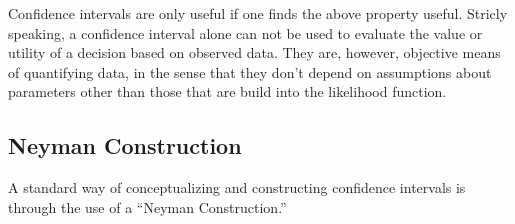 Confidence intervals are only useful if one finds the above property useful.
Stricly speaking, a confidence interval alone can not be used to evaluate the value or utility of a decision based on observed data.
They are, however, objective means of quantifying data, in the sense that they don't depend on assumptions about parameters other than those that are build into the likelihood function.

\subsection{Neyman Construction}

A standard way of conceptualizing and constructing confidence intervals is through the use of a ``Neyman Construction.'' 




